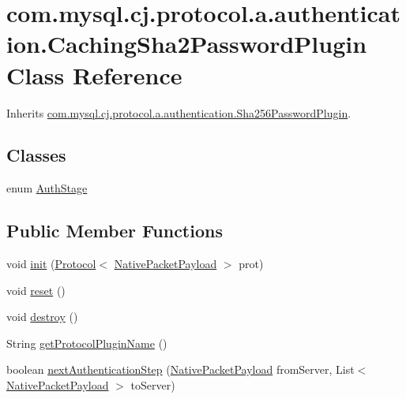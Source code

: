 \hypertarget{classcom_1_1mysql_1_1cj_1_1protocol_1_1a_1_1authentication_1_1_caching_sha2_password_plugin}{}\section{com.\+mysql.\+cj.\+protocol.\+a.\+authentication.\+Caching\+Sha2\+Password\+Plugin Class Reference}
\label{classcom_1_1mysql_1_1cj_1_1protocol_1_1a_1_1authentication_1_1_caching_sha2_password_plugin}


Inherits \mbox{\hyperlink{classcom_1_1mysql_1_1cj_1_1protocol_1_1a_1_1authentication_1_1_sha256_password_plugin}{com.\+mysql.\+cj.\+protocol.\+a.\+authentication.\+Sha256\+Password\+Plugin}}.

\subsection*{Classes}
\begin{DoxyCompactItemize}
\item 
enum \mbox{\hyperlink{enumcom_1_1mysql_1_1cj_1_1protocol_1_1a_1_1authentication_1_1_caching_sha2_password_plugin_1_1_auth_stage}{Auth\+Stage}}
\end{DoxyCompactItemize}
\subsection*{Public Member Functions}
\begin{DoxyCompactItemize}
\item 
void \mbox{\hyperlink{classcom_1_1mysql_1_1cj_1_1protocol_1_1a_1_1authentication_1_1_caching_sha2_password_plugin_a1f6a325af990916ce300b592abc9916c}{init}} (\mbox{\hyperlink{interfacecom_1_1mysql_1_1cj_1_1protocol_1_1_protocol}{Protocol}}$<$ \mbox{\hyperlink{classcom_1_1mysql_1_1cj_1_1protocol_1_1a_1_1_native_packet_payload}{Native\+Packet\+Payload}} $>$ prot)
\item 
void \mbox{\hyperlink{classcom_1_1mysql_1_1cj_1_1protocol_1_1a_1_1authentication_1_1_caching_sha2_password_plugin_a7f042851c3087a8bdf431023ed01b29c}{reset}} ()
\item 
void \mbox{\hyperlink{classcom_1_1mysql_1_1cj_1_1protocol_1_1a_1_1authentication_1_1_caching_sha2_password_plugin_ae1487e57db91585f60ffa884c6f10a54}{destroy}} ()
\item 
String \mbox{\hyperlink{classcom_1_1mysql_1_1cj_1_1protocol_1_1a_1_1authentication_1_1_caching_sha2_password_plugin_adefb39fe1f5c9624bf96076a6be9ffc0}{get\+Protocol\+Plugin\+Name}} ()
\item 
boolean \mbox{\hyperlink{classcom_1_1mysql_1_1cj_1_1protocol_1_1a_1_1authentication_1_1_caching_sha2_password_plugin_ac9b5781a9b319a2d81290a0a115a4039}{next\+Authentication\+Step}} (\mbox{\hyperlink{classcom_1_1mysql_1_1cj_1_1protocol_1_1a_1_1_native_packet_payload}{Native\+Packet\+Payload}} from\+Server, List$<$ \mbox{\hyperlink{classcom_1_1mysql_1_1cj_1_1protocol_1_1a_1_1_native_packet_payload}{Native\+Packet\+Payload}} $>$ to\+Server)
\end{DoxyCompactItemize}
